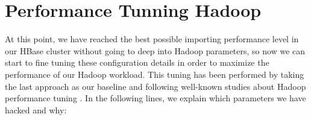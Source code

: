 

\section{Performance Tunning Hadoop}

At this point, we have reached the best possible importing performance level in our HBase cluster without going to deep into Hadoop parameters, so now we can start to fine tuning these configuration details in order to maximize the performance of our Hadoop workload. This tuning has been performed by taking the last approach as our baseline and following well-known studies about Hadoop performance tuning \cite{babu2010towards} \cite{heger2013hadoop}. In the following lines, we explain which parameters we have hacked and why:

